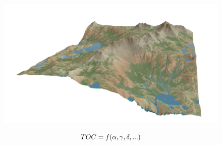 \documentclass[aspectratio=169]{beamer} %
\begin{document}
{
{
\begin{frame}

	\begin{figure}
		\centering
		\includegraphics[scale=0.4]{images/HL.png}
	\end{figure}
	\pause
\begin{equation}
	\begin{huge}
         TOC = f(\alpha,\gamma,\delta,...)  \nonumber
	\end{huge}
\end{equation}
\end{frame}
}
}
\end{document}
